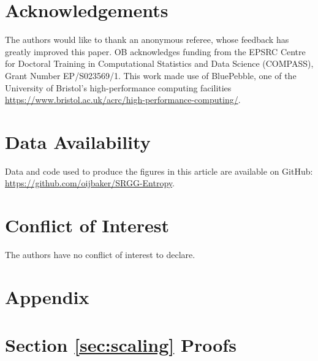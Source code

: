 \documentclass{article}
\begin{document}
\section*{Acknowledgements}

The authors would like to thank an anonymous referee, whose feedback has greatly improved this paper. OB acknowledges funding from the EPSRC Centre for Doctoral Training in Computational Statistics and Data Science (COMPASS), Grant Number EP/S023569/1. This work made use of BluePebble, one of the University of Bristol’s high-performance computing facilities \url{https://www.bristol.ac.uk/acrc/high-performance-computing/}.

\section*{Data Availability}

Data and code used to produce the figures in this article are available on GitHub: \url{https://github.com/oijbaker/SRGG-Entropy}.

\section*{Conflict of Interest}
The authors have no conflict of interest to declare.

\appendix
\section*{Appendix}
\section{Section \ref{sec:scaling} Proofs}
\label{sec:proofs}
\end{document}
